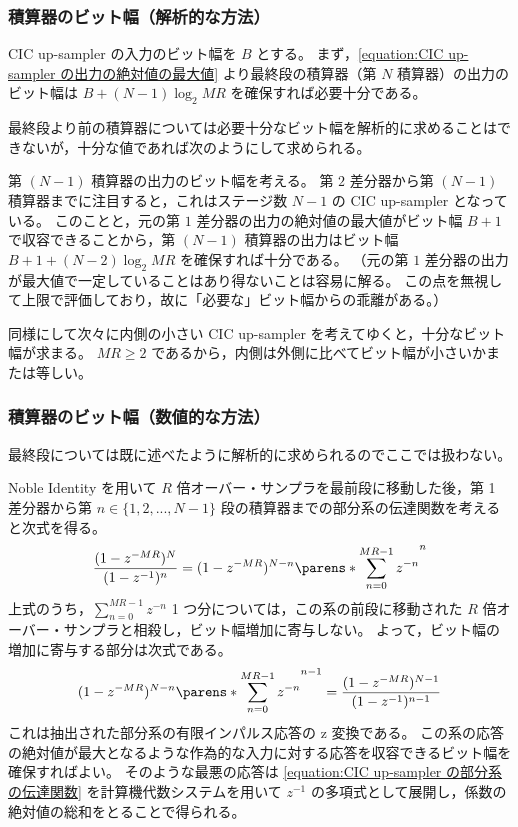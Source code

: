         \subsubsection{積算器のビット幅（解析的な方法）}
            CIC up-sampler の入力のビット幅を $B$ とする。
            まず，\cref{equation:CIC up-sampler の出力の絶対値の最大値} より最終段の積算器（第 $N$ 積算器）の出力のビット幅は $B + (N-1)\log_2 MR$ を確保すれば必要十分である。
            \par
            最終段より前の積算器については必要十分なビット幅を解析的に求めることはできないが，十分な値であれば次のようにして求められる。
            \par
            第 $(N-1)$ 積算器の出力のビット幅を考える。
            第 $2$ 差分器から第 $(N-1)$ 積算器までに注目すると，これはステージ数 $N-1$ の CIC up-sampler となっている。
            このことと，元の第 $1$ 差分器の出力の絶対値の最大値がビット幅 $B+1$ で収容できることから，第 $(N-1)$ 積算器の出力はビット幅 $B + 1 + (N-2)\log_2 MR$ を確保すれば十分である。
            （元の第 $1$ 差分器の出力が最大値で一定していることはあり得ないことは容易に解る。
            この点を無視して上限で評価しており，故に「必要な」ビット幅からの乖離がある。）
            \par
            同様にして次々に内側の小さい CIC up-sampler を考えてゆくと，十分なビット幅が求まる。
            $MR\geq 2$ であるから，内側は外側に比べてビット幅が小さいかまたは等しい。
        \subsubsection{積算器のビット幅（数値的な方法）}
            最終段については既に述べたように解析的に求められるのでここでは扱わない。
            \par
            Noble Identity を用いて $R$ 倍オーバー・サンプラを最前段に移動した後，第 1 差分器から第 $n\in\{1,2,...,N-1\}$ 段の積算器までの部分系の伝達関数を考えると次式を得る。
            \[ \frac{(1-z^{-MR})^N}{(1-z^{-1})^n} = (1-z^{-MR})^{N-n}\parens*{\sum_{n=0}^{MR-1} z^{-n}}^n \]
            上式のうち，$\sum_{n=0}^{MR-1} z^{-n}$ 1 つ分については，この系の前段に移動された $R$ 倍オーバー・サンプラと相殺し，ビット幅増加に寄与しない。
            よって，ビット幅の増加に寄与する部分は次式である。
            \begin{equation}
                (1-z^{-MR})^{N-n}\parens*{\sum_{n=0}^{MR-1} z^{-n}}^{n-1} = \frac{(1-z^{-MR})^{N-1}}{(1-z^{-1})^{n-1}} \label{equation:CIC up-sampler の部分系の伝達関数}
            \end{equation}
            これは抽出された部分系の有限インパルス応答の z 変換である。
            この系の応答の絶対値が最大となるような作為的な入力に対する応答を収容できるビット幅を確保すればよい。
            そのような最悪の応答は \cref{equation:CIC up-sampler の部分系の伝達関数} を計算機代数システムを用いて $z^{-1}$ の多項式として展開し，係数の絶対値の総和をとることで得られる。
